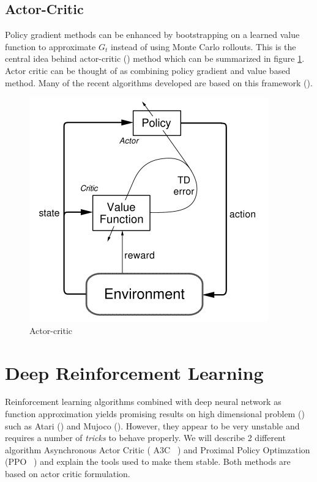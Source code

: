 \subsection{Actor-Critic}
Policy gradient methods can be enhanced by bootstrapping on a learned value function to approximate $G_t$ instead of using Monte Carlo rollouts. This is the central idea behind actor-critic (\cite{konda2000actor}) method which can be summarized in figure \ref{fig:actor_critic}. Actor critic can be thought of as combining policy gradient and value based method. Many of the recent algorithms developed are based on this framework (\cite{mnih2016asynchronous,schulman2017proximal,wu2017scalable}).
\begin{figure}
    \centering
    \includegraphics[scale=0.6]{fig/actor_critic.png}
    \caption{Actor-critic}
    \label{fig:actor_critic}
\end{figure}
\section{Deep Reinforcement Learning}
Reinforcement learning algorithms combined with deep neural network as function approximation yields promising results on high dimensional problem (\cite{mnih2013playing,mnih2016asynchronous,schulman2017proximal}) such as Atari (\cite{bellemare2013arcade}) and Mujoco (\cite{todorov2012mujoco}). However, they appear to be very unstable and requires a number of \emph{tricks} to behave properly. We will describe 2 different algorithm Asynchronous Actor Critic ( A3C ~\cite{mnih2016asynchronous}) and Proximal Policy Optimzation (PPO ~\cite{schulman2017proximal}) and explain the tools used to make them stable. Both methods are based on actor critic formulation. 
